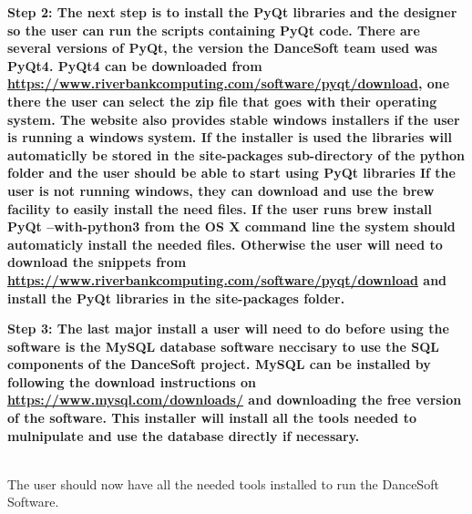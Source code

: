 \bf Step 2: \rm
	The next step is to install the PyQt libraries and the designer so the user can run the scripts containing PyQt code. There are several versions of PyQt, the version the DanceSoft team used was PyQt4. PyQt4 can be downloaded from \url{https://www.riverbankcomputing.com/software/pyqt/download}, one there the user can select the zip file that goes with their operating system. The website also provides stable windows installers if the user is running a windows system. If the installer is used the libraries will automaticlly be stored in the site-packages sub-directory of the python folder and the user should be able to start using PyQt libraries
	If the user is not running windows, they can download and use the brew facility to easily install the need files. If the user runs \bf brew install PyQt --with-python3 \rm from the OS X command line the system should automaticly install the needed files.
	 Otherwise the user will need to download the snippets from \url{https://www.riverbankcomputing.com/software/pyqt/download} and install the PyQt libraries in the site-packages folder.
	 
\bf Step 3: \rm
	The last major install a user will need to do before using the software is the MySQL database software neccisary to use the SQL components of the DanceSoft project.
	MySQL can be installed by following the download instructions on \url{https://www.mysql.com/downloads/} and downloading the free version of the software. This installer will install all the tools needed to mulnipulate and use the database directly if necessary.
	
\\	
	
The user should now have all the needed tools installed to run the DanceSoft Software.
	 
	



